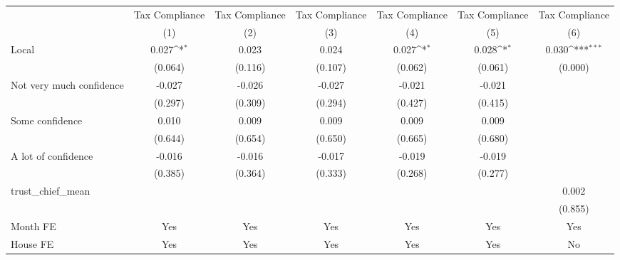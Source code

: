 {
\def\sym#1{\ifmmode^{#1}\else\(^{#1}\)\fi}
\begin{tabular}{l*{6}{c}}
\toprule
                &\multicolumn{1}{c}{Tax Compliance}&\multicolumn{1}{c}{Tax Compliance}&\multicolumn{1}{c}{Tax Compliance}&\multicolumn{1}{c}{Tax Compliance}&\multicolumn{1}{c}{Tax Compliance}&\multicolumn{1}{c}{Tax Compliance}\\
                &\multicolumn{1}{c}{(1)}         &\multicolumn{1}{c}{(2)}         &\multicolumn{1}{c}{(3)}         &\multicolumn{1}{c}{(4)}         &\multicolumn{1}{c}{(5)}         &\multicolumn{1}{c}{(6)}         \\
\midrule
Local           &    0.027\sym{*}  &    0.023         &    0.024         &    0.027\sym{*}  &    0.028\sym{*}  &    0.030\sym{***}\\
                &  (0.064)         &  (0.116)         &  (0.107)         &  (0.062)         &  (0.061)         &  (0.000)         \\
Not very much confidence&   -0.027         &   -0.026         &   -0.027         &   -0.021         &   -0.021         &                  \\
                &  (0.297)         &  (0.309)         &  (0.294)         &  (0.427)         &  (0.415)         &                  \\
Some confidence &    0.010         &    0.009         &    0.009         &    0.009         &    0.009         &                  \\
                &  (0.644)         &  (0.654)         &  (0.650)         &  (0.665)         &  (0.680)         &                  \\
A lot of confidence&   -0.016         &   -0.016         &   -0.017         &   -0.019         &   -0.019         &                  \\
                &  (0.385)         &  (0.364)         &  (0.333)         &  (0.268)         &  (0.277)         &                  \\
trust\_chief\_mean&                  &                  &                  &                  &                  &    0.002         \\
                &                  &                  &                  &                  &                  &  (0.855)         \\
Month FE        &      Yes         &      Yes         &      Yes         &      Yes         &      Yes         &      Yes         \\
House FE        &      Yes         &      Yes         &      Yes         &      Yes         &      Yes         &       No         \\

\end{tabular}}
